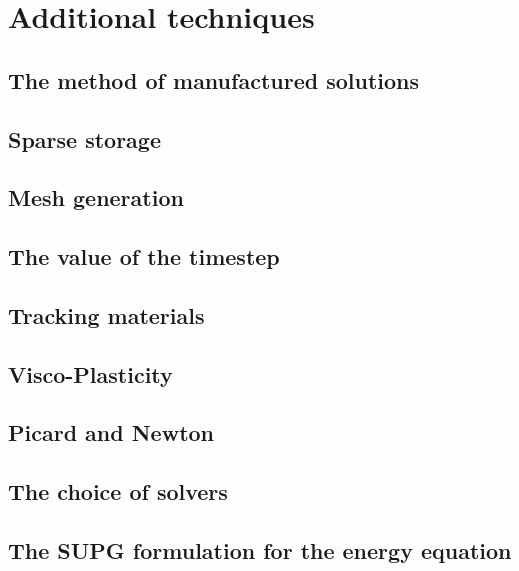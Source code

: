 \documentclass[a4paper]{article}
\begin{document}



\newpage
\section{Additional techniques}

\subsection{The method of manufactured solutions}

\subsection{Sparse storage}

\subsection{Mesh generation}

\subsection{The value of the timestep}

\subsection{Tracking materials}

\subsection{Visco-Plasticity}

\subsection{Picard and Newton}

\subsection{The choice of solvers}

\subsection{The SUPG formulation for the energy equation}
\end{document}
